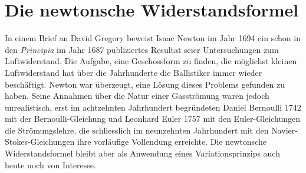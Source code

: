 %
%
%
%
\chapter{Die newtonsche Widerstandsformel\label{chapter:widerstand}}
\begin{refsection}

In einem Brief an David Gregory beweist Isaac Newton im Jahr 1694
ein schon in den {\em Principia} \cite{widerstand:principia}
im Jahr 1687 publiziertes Resultat seier Untersuchungen zum
Luftwiderstand.
Die Aufgabe, eine Geschossform zu finden, die möglichst kleinen
Luftwiderstand hat über die Jahrhunderte die Ballistiker immer 
wieder beschäftigt.
Newton war überzeugt, eine Lösung dieses Problems gefunden zu haben.
Seine Annahmen über die Natur einer Gasströmung waren jedoch 
unrealistisch, erst im achtzehnten Jahrhundert begründeten
Daniel Bernoulli 1742 mit der Bernoulli-Gleichung und Leonhard Euler
1757 mit den Euler-Gleichungen die Strömungslehre, die schliesslich im
neunzehnten Jahrhundert mit den Navier-Stokes-Gleichungen ihre
vorläufige Vollendung erreichte.
Die newtonsche Widerstandsformel bleibt aber als Anwendung eines
Variationsprinzips auch heute noch von Interesse.




\printbibliography[heading=subbibliography]
\end{refsection}
